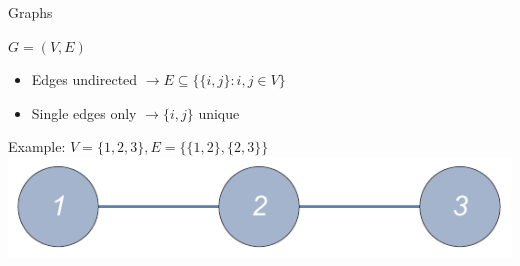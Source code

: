 \documentclass{beamer}
\begin{document}
\begin{frame}[t]{Graphs}
	\begin{exampleblock}{}
	\setlength\abovedisplayskip{-8pt}
	\begin{center}
		$G = (V,E)$
	\end{center}
	\end{exampleblock}
	\begin{itemize}
		\item Edges undirected $\rightarrow E \subseteq \{\{i,j\}\colon i,j \in V\}$
		\item Single edges only $\rightarrow \{i,j\}$ unique
	\end{itemize}   
	Example: $V = \{1,2,3\}, E = \{\{1,2\},\{2,3\}\}$
		\includegraphics[trim=0 0 0 -5mm, width=\textwidth]{Images/chain3}
\end{frame}
\end{document}
